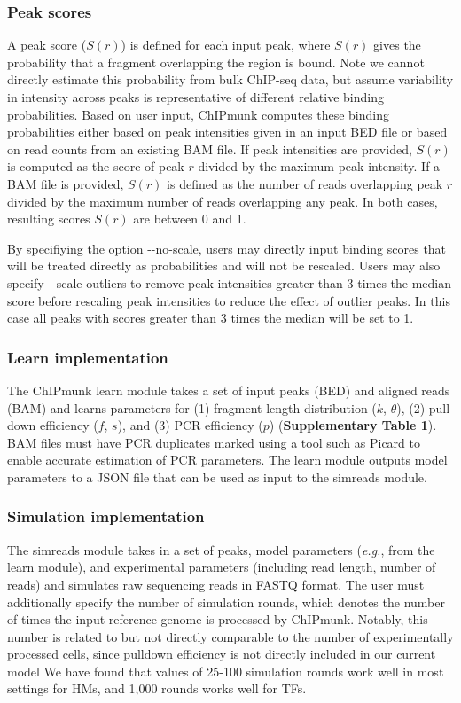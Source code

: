 \documentclass[12pt]{article}
\begin{document}
\subsubsection*{Peak scores}
A peak score ($S(r)$) is defined for each input peak, where $S(r)$ gives the probability that a fragment overlapping the region is bound.
Note we cannot directly estimate this probability from bulk ChIP-seq data, but assume variability in intensity across peaks is representative of different relative binding probabilities.
Based on user input, ChIPmunk computes these binding probabilities either based on peak intensities given in an input BED file or based on read counts from an existing BAM file.
If peak intensities are provided, $S(r)$ is computed as the score of peak $r$ divided by the maximum peak intensity.
If a BAM file is provided, $S(r)$ is defined as the number of reads overlapping peak $r$ divided by the maximum number of reads overlapping any peak.
In both cases, resulting scores $S(r)$ are between 0 and 1.

By specifiying the option -{}-no-scale, users may directly input binding scores that will be treated directly as probabilities and will not be rescaled.
Users may also specify -{}-scale-outliers to remove peak intensities greater than 3 times the median score before rescaling peak intensities to reduce the effect of outlier peaks. In this case all peaks with scores greater than 3 times the median will be set to 1.

\subsubsection*{Learn implementation}
The ChIPmunk learn module takes a set of input peaks (BED) and aligned reads (BAM) and learns parameters for (1) fragment length distribution ($k$, $\theta$), (2) pull-down efficiency ($f$, $s$), and (3) PCR efficiency ($p$) (\textbf{Supplementary Table 1}).
BAM files must have PCR duplicates marked using a tool such as Picard \cite{picard} to enable accurate estimation of PCR parameters.
The learn module  outputs model parameters to a JSON file that can be used as input to the simreads module.

\subsubsection*{Simulation implementation}

The simreads module takes in a set of peaks, model parameters (\emph{e.g.}, from the learn module), and experimental parameters (including read length, number of reads) and simulates raw sequencing reads in FASTQ format.
The user must additionally specify the number of simulation rounds, which denotes the number of times the input reference genome is processed by ChIPmunk. Notably, this number is related to but not directly comparable to the number of experimentally processed cells, since pulldown efficiency is not directly included in our current model
We have found that values of 25-100 simulation rounds work well in most settings for HMs, and 1,000 rounds works well for TFs.
\end{document}
